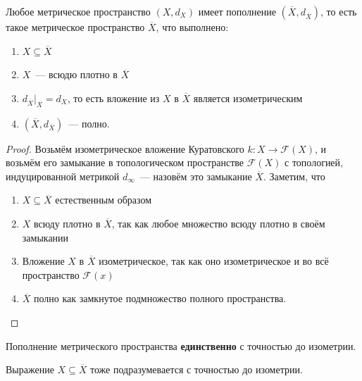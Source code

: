 \documentclass[11pt]{report}
\begin{document}
    \begin{Theorem}
    Любое метрическое пространство $(X, d_X)$ имеет пополнение $(\overline{X}, d_{\overline{X}})$, то есть такое метрическое пространство $\overline{X}$, что выполнено:
    \begin{enumerate}
        \item $X \subseteq \overline{X}$
        \item $X$~--- всюдю плотно в $\overline{X}$
        \item $d_{\overline{X}}|_X = d_X$, то есть вложение из $X$ в $\overline{X}$ является изометрическим
        \vspace{3pt}
        \item $(\overline{X}, d_{\overline{X}})$~--- полно.
    \end{enumerate}
    \end{Theorem}
    \begin{proof}
    Возьмём изометрическое вложение Куратовского $k: X \to \mathcal{F}(X)$, и возьмём его замыкание в топологическом пространстве $\mathcal{F}(X)$ с топологией, индуцированной метрикой $d_{\infty}$~--- назовём это замыкание $\overline{X}$. Заметим, что
    \begin{enumerate}
        \item $X \subseteq \overline{X}$ естественным образом
        \item $X$ всюду плотно в $\overline{X}$, так как любое множество всюду плотно в своём замыкании
        \item Вложение $X$ в $\overline{X}$ изометрическое, так как оно изометрическое и во всё пространство $\mathcal{F}(x)$
        \item $\overline{X}$ полно как замкнутое подмножество полного пространства.
    \end{enumerate}
    \end{proof}


    \begin{remark}
    Пополнение метрического пространства \textbf{единственно} с точностью до изометрии.
    \end{remark}

    \begin{remark}
    Выражение $X \subseteq \overline{X}$ тоже подразумевается с точностью до изометрии.
    \end{remark}
\end{document}

